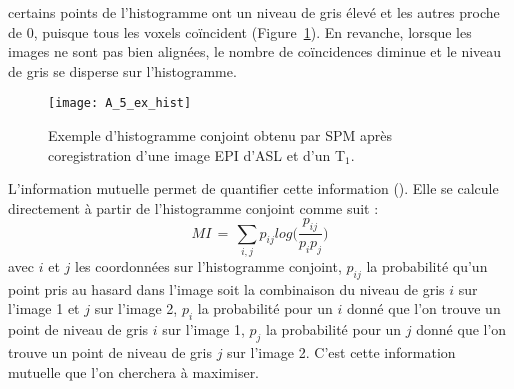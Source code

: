 certains points de l’histogramme ont un niveau de gris élevé et les autres proche de 0, puisque tous
les voxels coïncident (Figure~\ref{fig:A_5_ex_hist}). En revanche, lorsque les images ne sont pas bien alignées, le nombre
de coïncidences diminue et le niveau de gris se disperse sur l’histogramme.\\
\begin{figure}[!t]
\centering
\texttt{[image: A\_5\_ex\_hist]}
\caption{Exemple d'histogramme conjoint obtenu par SPM après coregistration d'une image EPI d'ASL et d'un T$_1$.}
\label{fig:A_5_ex_hist}	
\end{figure}
L’information mutuelle permet de quantifier cette information (\cite{Collignon1995}). Elle se calcule directement à
partir de l’histogramme conjoint comme suit :
\begin{equation}
MI\,=\,\sum_{i,j}p_{ij}log\biggl(\frac{p_{ij}}{p_ip_j}\biggr)
\end{equation}
avec $i$ et $j$ les coordonnées sur l'histogramme conjoint, $p_{ij}$ la probabilité qu’un point pris au hasard dans
l’image soit la combinaison du niveau de gris $i$ sur l’image 1 et $j$ sur l’image 2, $p_i$ la probabilité pour un
$i$ donné que l’on trouve un point de niveau de gris $i$ sur l’image 1, $p_j$ la probabilité pour un $j$ donné que
l’on trouve un point de niveau de gris $j$ sur l’image 2. C’est cette information mutuelle que l’on
cherchera à maximiser.\\
